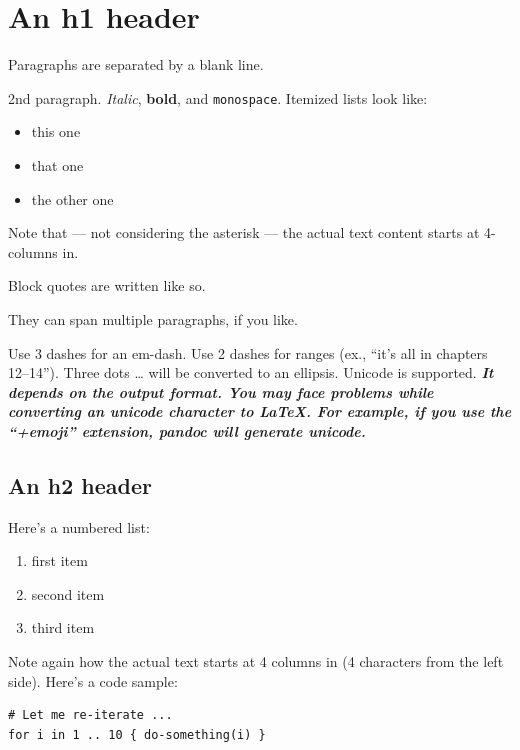 \documentclass[
  12pt,
  a4paper,
  oneside,tablecaptionabove
]{scrbook}
\newcommand{\passthrough}[1]{#1}
\providecommand{\tightlist}{%
  \setlength{\itemsep}{0pt}\setlength{\parskip}{0pt}}
\renewenvironment{quote}{\begin{customblockquote}\list{}{\rightmargin=0em\leftmargin=0em}%
\item\relax\color{blockquote-text}\ignorespaces}{\unskip\unskip\endlist\end{customblockquote}}
\begin{document}
\hypertarget{an-h1-header}{%
\section{An h1 header}\label{an-h1-header}}

Paragraphs are separated by a blank line.

2nd paragraph. \emph{Italic}, \textbf{bold}, and
\passthrough{\lstinline!monospace!}. Itemized lists look like:

\begin{itemize}
\tightlist
\item
  this one
\item
  that one
\item
  the other one
\end{itemize}

Note that --- not considering the asterisk --- the actual text content
starts at 4-columns in.

\begin{quote}
Block quotes are written like so.

They can span multiple paragraphs, if you like.
\end{quote}

Use 3 dashes for an em-dash. Use 2 dashes for ranges (ex., ``it's all in
chapters 12--14''). Three dots \ldots{} will be converted to an
ellipsis. Unicode is supported. \textbf{\emph{It depends on the output
format. You may face problems while converting an unicode character to
LaTeX. For example, if you use the ``+emoji'' extension, pandoc will
generate unicode.}}

\hypertarget{an-h2-header}{%
\subsection{An h2 header}\label{an-h2-header}}

Here's a numbered list:

\begin{enumerate}
\def\labelenumi{\arabic{enumi}.}
\tightlist
\item
  first item
\item
  second item
\item
  third item
\end{enumerate}

Note again how the actual text starts at 4 columns in (4 characters from
the left side). Here's a code sample:

\begin{lstlisting}
# Let me re-iterate ...
for i in 1 .. 10 { do-something(i) }
\end{lstlisting}
\end{document}
